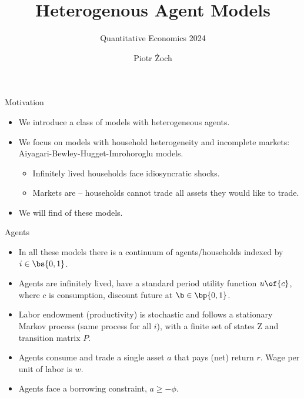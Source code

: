 \documentclass[11pt,xcolor={dvipsnames},aspectratio=159,hyperref={pdftex,pdfpagemode=UseNone,hidelinks,pdfdisplaydoctitle=true},usepdftitle=false]{beamer}
\begin{document}
\title{Heterogenous Agent Models}
\subtitle{Quantitative Economics 2024}


\author{Piotr Żoch}%
\frame{\titlepage}


\begin{frame}{Motivation}   
   
    \begin{itemize}
        \item We introduce a class of models with heterogeneous agents.
        \item We focus on models with household heterogeneity and incomplete markets: Aiyagari-Bewley-Hugget-Imrohoroglu models.
        \begin{itemize}
            \item Infinitely lived households face idiosyncratic shocks.
            \item Markets are  -- households cannot trade all assets they would like to trade.
        \end{itemize}
        \item We will find  of these models.
    \end{itemize}
    \end{frame}


\begin{frame}{Agents}   
   
    \begin{itemize}
        \item In all these models there is a continuum of agents/households indexed by $i\in\bs{0,1}$.
        \item Agents are infinitely lived, have a standard period utility function $u\of{c}$, where $c$ is consumption, discount future at $\b\in\bp{0,1}$.
        \item Labor endowment (productivity) is stochastic and follows a stationary Markov process (same process for all $i$), with a finite set of states $\text{Z}$ and transition matrix $P$.
        \item Agents consume and trade a single asset $a$ that pays (net) return $r$. Wage per unit of labor is $w$.
        \item Agents face a borrowing constraint, $a\geq -\phi$.
    \end{itemize}
    \end{frame}
\end{document}
